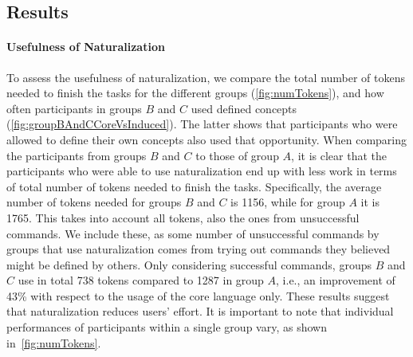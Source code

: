 \documentclass[letterpaper, 10 pt, conference]{ieeeconf}  %
\begin{document}
\subsection{Results}

\paragraph*{\textbf{Usefulness of Naturalization}}
To assess the usefulness of naturalization, we compare the total number of
tokens needed to finish the tasks for the different groups
(\autoref{fig:numTokens}), and how often participants in groups $B$ and $C$ used
defined concepts (\autoref{fig:groupBAndCCoreVsInduced}).
The latter shows that participants who were allowed to define their own concepts
also used that opportunity.
When comparing the participants from groups $B$ and $C$ to those of group $A$, 
it is clear that the participants who were able to use naturalization end up with less work in 
terms of total number of tokens needed to finish the tasks. 
Specifically, the average number of tokens needed for groups $B$ and $C$ is 1156, 
while for group $A$ it is 1765. 
This takes into account all tokens, also the ones from unsuccessful commands. 
We include these, as some number of unsuccessful commands by groups that use naturalization comes from trying 
out commands they believed might be defined by others.
Only considering successful commands, groups $B$ and $C$ use in total 738 tokens compared to 1287 in group $A$, 
i.e., an improvement of 43\% with respect to the usage of the core language only.
These results suggest that naturalization reduces users' effort. 
It is important to note that individual performances of participants within a single group vary, as shown in~\autoref{fig:numTokens}.
\end{document}
